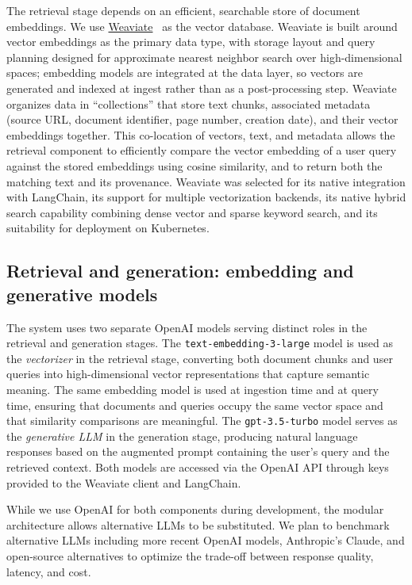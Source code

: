 The retrieval stage depends on an efficient, searchable store of document embeddings.
We use \href{https://weaviate.io}{Weaviate}~\cite{weaviate} as the vector database.
Weaviate is built around vector embeddings as the primary data type, with storage layout and query planning designed for approximate nearest neighbor search over high-dimensional spaces; embedding models are integrated at the data layer, so vectors are generated and indexed at ingest rather than as a post-processing step.
Weaviate organizes data in ``collections'' that store text chunks, associated metadata (source URL, document identifier, page number, creation date), and their vector embeddings together.
This co-location of vectors, text, and metadata allows the retrieval component to efficiently compare the vector embedding of a user query against the stored embeddings using cosine similarity, and to return both the matching text and its provenance.
Weaviate was selected for its native integration with LangChain\cite{langchain}, its support for multiple vectorization backends, its native hybrid search capability combining dense vector and sparse keyword search, and its suitability for deployment on \gls{Kubernetes}.
 
\subsection{Retrieval and generation: embedding and generative models}
\label{sec:llm}
 
The system uses two separate OpenAI models serving distinct roles in the retrieval and generation stages.
The \texttt{text-embedding-3-large} model is used as the \emph{vectorizer} in the retrieval stage, converting both document chunks and user queries into high-dimensional vector representations that capture semantic meaning.
The same embedding model is used at ingestion time and at query time, ensuring that documents and queries occupy the same vector space and that similarity comparisons are meaningful.
The \texttt{gpt-3.5-turbo} model serves as the \emph{generative LLM} in the generation stage, producing natural language responses based on the augmented prompt containing the user's query and the retrieved context.
Both models are accessed via the OpenAI API through keys provided to the Weaviate client and LangChain.
 
 
While we use OpenAI for both components during development, the modular architecture allows alternative LLMs to be substituted.
We plan to benchmark alternative LLMs including more recent OpenAI models, Anthropic's Claude, and open-source alternatives to optimize the trade-off between response quality, latency, and cost.
 
